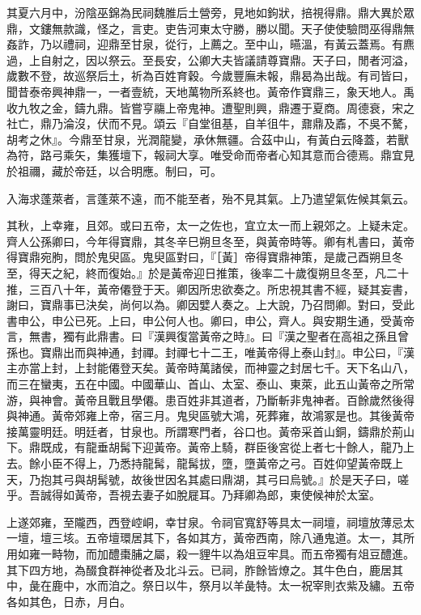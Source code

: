 其夏六月中，汾陰巫錦為民祠魏脽后土營旁，見地如鉤狀，掊視得鼎。鼎大異於眾鼎，文鏤無款識，怪之，言吏。吏告河東太守勝，勝以聞。天子使使驗問巫得鼎無姦詐，乃以禮祠，迎鼎至甘泉，從行，上薦之。至中山，曣溫，有黃云蓋焉。有麃過，上自射之，因以祭云。至長安，公卿大夫皆議請尊寶鼎。天子曰，閒者河溢，歲數不登，故巡祭后土，祈為百姓育穀。今歲豐廡未報，鼎曷為出哉。有司皆曰，聞昔泰帝興神鼎一，一者壹統，天地萬物所系終也。黃帝作寶鼎三，象天地人。禹收九牧之金，鑄九鼎。皆嘗亨鬺上帝鬼神。遭聖則興，鼎遷于夏商。周德衰，宋之社亡，鼎乃淪沒，伏而不見。頌云『自堂徂基，自羊徂牛，鼐鼎及鼒，不吳不驁，胡考之休』。今鼎至甘泉，光潤龍變，承休無疆。合茲中山，有黃白云降蓋，若獸為符，路弓乘矢，集獲壇下，報祠大享。唯受命而帝者心知其意而合德焉。鼎宜見於祖禰，藏於帝廷，以合明應。制曰，可。

入海求蓬萊者，言蓬萊不遠，而不能至者，殆不見其氣。上乃遣望氣佐候其氣云。

其秋，上幸雍，且郊。或曰五帝，太一之佐也，宜立太一而上親郊之。上疑未定。齊人公孫卿曰，今年得寶鼎，其冬辛巳朔旦冬至，與黃帝時等。卿有札書曰，黃帝得寶鼎宛朐，問於鬼臾區。鬼臾區對曰，『［黃］帝得寶鼎神策，是歲己酉朔旦冬至，得天之紀，終而復始。』於是黃帝迎日推策，後率二十歲復朔旦冬至，凡二十推，三百八十年，黃帝僊登于天。卿因所忠欲奏之。所忠視其書不經，疑其妄書，謝曰，寶鼎事已決矣，尚何以為。卿因嬖人奏之。上大說，乃召問卿。對曰，受此書申公，申公已死。上曰，申公何人也。卿曰，申公，齊人。與安期生通，受黃帝言，無書，獨有此鼎書。曰『漢興復當黃帝之時』。曰『漢之聖者在高祖之孫且曾孫也。寶鼎出而與神通，封禪。封禪七十二王，唯黃帝得上泰山封』。申公曰，『漢主亦當上封，上封能僊登天矣。黃帝時萬諸侯，而神靈之封居七千。天下名山八，而三在蠻夷，五在中國。中國華山、首山、太室、泰山、東萊，此五山黃帝之所常游，與神會。黃帝且戰且學僊。患百姓非其道者，乃斷斬非鬼神者。百餘歲然後得與神通。黃帝郊雍上帝，宿三月。鬼臾區號大鴻，死葬雍，故鴻冢是也。其後黃帝接萬靈明廷。明廷者，甘泉也。所謂寒門者，谷口也。黃帝采首山銅，鑄鼎於荊山下。鼎既成，有龍垂胡髯下迎黃帝。黃帝上騎，群臣後宮從上者七十餘人，龍乃上去。餘小臣不得上，乃悉持龍髯，龍髯拔，墮，墮黃帝之弓。百姓仰望黃帝既上天，乃抱其弓與胡髯號，故後世因名其處曰鼎湖，其弓曰烏號。』於是天子曰，嗟乎。吾誠得如黃帝，吾視去妻子如脫屣耳。乃拜卿為郎，東使候神於太室。

上遂郊雍，至隴西，西登崆峒，幸甘泉。令祠官寬舒等具太一祠壇，祠壇放薄忌太一壇，壇三垓。五帝壇環居其下，各如其方，黃帝西南，除八通鬼道。太一，其所用如雍一畤物，而加醴棗脯之屬，殺一貍牛以為俎豆牢具。而五帝獨有俎豆醴進。其下四方地，為醊食群神從者及北斗云。已祠，胙餘皆燎之。其牛色白，鹿居其中，彘在鹿中，水而洎之。祭日以牛，祭月以羊彘特。太一祝宰則衣紫及繡。五帝各如其色，日赤，月白。

